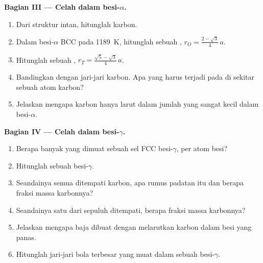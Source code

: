 \begin{problem}
\medskip
\noindent\textbf{Bagian III --- Celah dalam besi-$\alpha$.}
\begin{enumerate}[resume]
  \item Dari struktur intan, hitunglah  karbon.
  \item Dalam besi-$\alpha$ BCC pada \qty{1189}{K}, hitunglah
         sebuah , $r_O = \frac{2 - \sqrt3}{4}\,a$.
  \item Hitunglah  sebuah , $r_T = \frac{\sqrt5 -
        \sqrt3}{4}\,a$.
  \item Bandingkan dengan jari-jari karbon. Apa yang harus terjadi pada
         di sekitar sebuah atom karbon?
  \item Jelaskan mengapa karbon hanya larut dalam jumlah yang sangat kecil
        dalam besi-$\alpha$.
\end{enumerate}

\medskip
\noindent\textbf{Bagian IV --- Celah dalam besi-$\gamma$.}
\begin{enumerate}[resume]
  \item Berapa banyak  yang dimuat sebuah sel FCC
        besi-$\gamma$, per atom besi?
  \item Hitunglah  sebuah  besi-$\gamma$.
  \item Seandainya semua  ditempati karbon, apa rumus
        padatan itu dan berapa fraksi massa karbonnya?
  \item Seandainya satu dari sepuluh  ditempati, berapa
        fraksi massa karbonnya?
  \item Jelaskan mengapa baja dibuat dengan melarutkan karbon dalam besi
        yang panas.
  \item Hitunglah jari-jari bola terbesar yang muat dalam sebuah  besi-$\gamma$.
\end{enumerate}
\end{problem}
